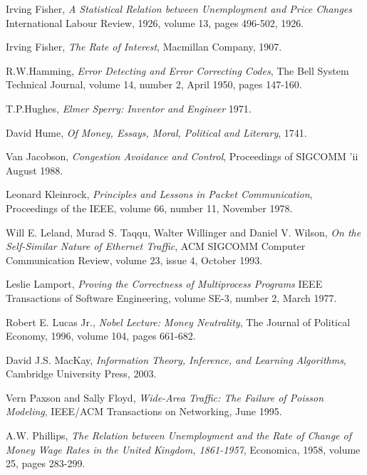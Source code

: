 \begin{thebibliography}{9}
    Irving Fisher, 
    \emph{A Statistical Relation between Unemployment and Price Changes}
    International Labour Review,
    1926,
    volume 13,
    pages 496-502,
    1926.

    Irving Fisher,
    \emph{The Rate of Interest},
    Macmillan Company,
    1907.

    R.W.Hamming,
    \emph{Error Detecting and Error Correcting Codes},
    The Bell System Technical Journal,
    volume 14,
    number 2,
    April 1950,
    pages 147-160.

    T.P.Hughes,
    \emph{Elmer Sperry: Inventor and Engineer}
    1971.

    David Hume,
    \emph{Of Money, Essays, Moral, Political and Literary},
    1741.

    Van Jacobson,
    \emph{Congestion Avoidance and Control},
    Proceedings of SIGCOMM 'ii
    August 1988.

    Leonard Kleinrock,
    \emph{Principles and Lessons in Packet Communication},
    Proceedings of the IEEE,
    volume 66,
    number 11,
    November 1978.

    Will E. Leland, Murad S. Taqqu, Walter Willinger and Daniel V. Wilson,
    \emph{On the Self-Similar Nature of Ethernet Traffic},
    ACM SIGCOMM Computer Communication Review,
    volume 23,
    issue 4,
    October 1993.

    Leslie Lamport,
    \emph{Proving the Correctness of Multiprocess Programs}
    IEEE Transactions of Software Engineering,
    volume SE-3,
    number 2,
    March 1977.

    Robert E. Lucas Jr.,
    \emph{Nobel Lecture: Money Neutrality},
    The Journal of Political Economy,
    1996,
    volume 104,
    pages 661-682.

    David J.S. MacKay,
    \emph{Information Theory, Inference, and Learning Algorithms},
    Cambridge University Press,
    2003.

    Vern Paxson and Sally Floyd,
    \emph{Wide-Area Traffic: The Failure of Poisson Modeling},
    IEEE/ACM Transactions on Networking,
    June 1995.

    A.W. Phillips,
    \emph{The Relation between Unemployment and the Rate of Change of Money Wage Rates in the United Kingdom, 1861-1957},
    Economica,
    1958,
    volume 25,
    pages 283-299.


\end{thebibliography}
